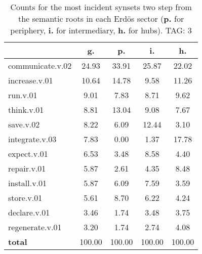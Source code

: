 \begin{table}[h!]
\begin{center}
\begin{tabular}{| l || c | c | c | c |}\hline
 & {\bf g.} & {\bf p.} & {\bf i.} & {\bf h.} \\\hline\hline
communicate.v.02 & 24.93  & 33.91  & 25.87  & 22.02 \\\hline
increase.v.01 & 10.64  & 14.78  & 9.58  & 11.26 \\\hline
run.v.01 & 9.01  & 7.83  & 8.71  & 9.62 \\\hline
think.v.01 & 8.81  & 13.04  & 9.08  & 7.67 \\\hline
save.v.02 & 8.22  & 6.09  & 12.44  & 3.10 \\\hline
integrate.v.03 & 7.83  & 0.00  & 1.37  & 17.78 \\\hline
expect.v.01 & 6.53  & 3.48  & 8.58  & 4.40 \\\hline
repair.v.01 & 5.87  & 2.61  & 4.35  & 8.48 \\\hline
install.v.01 & 5.87  & 6.09  & 7.59  & 3.59 \\\hline
store.v.01 & 5.61  & 8.70  & 6.22  & 4.24 \\\hline
declare.v.01 & 3.46  & 1.74  & 3.48  & 3.75 \\\hline
regenerate.v.01 & 3.20  & 1.74  & 2.74  & 4.08 \\\hline\hline
{{\bf total}} & 100.00  & 100.00  & 100.00  & 100.00 \\\hline
\end{tabular}
\caption{Counts for the most incident synsets two step from the semantic roots in each Erd\"os sector ({\bf p.} for periphery, {\bf i.} for intermediary, {\bf h.} for hubs). TAG: 3}
\end{center}
\end{table}
